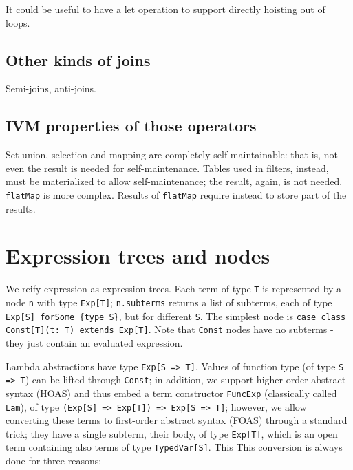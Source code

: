 \documentclass[preprint,authoryear,10pt]{sigplanconf}
\begin{document}
It could be useful to have a let operation to support directly hoisting
out of loops.

\subsection{Other kinds of joins}

Semi-joins, anti-joins.

\subsection{IVM properties of those operators}

Set union, selection and mapping are completely self-maintainable: that
is, not even the result is needed for self-maintenance. Tables used in
filters, instead, must be materialized to allow self-maintenance; the
result, again, is not needed. \texttt{flatMap} is more complex. Results
of \texttt{flatMap} require instead to store part of the results.

\section{Expression trees and nodes}

We reify expression as expression trees. Each term of type \texttt{T} is
represented by a node \texttt{n} with type \texttt{Exp{[}T{]}};
\texttt{n.subterms} returns a list of subterms, each of type
\texttt{Exp{[}S{]} forSome \{type S\}}, but for different \texttt{S}.
The simplest node is
\texttt{case class Const{[}T{]}(t: T) extends Exp{[}T{]}}. Note that
\texttt{Const} nodes have no subterms - they just contain an evaluated
expression.

Lambda abstractions have type \texttt{Exp{[}S =\textgreater{} T{]}}.
Values of function type (of type \texttt{S =\textgreater{} T}) can be
lifted through \texttt{Const}; in addition, we support higher-order
abstract syntax (HOAS) and thus embed a term constructor
\texttt{FuncExp} (classically called \texttt{Lam}), of type
\texttt{(Exp{[}S{]} =\textgreater{} Exp{[}T{]}) =\textgreater{} Exp{[}S =\textgreater{} T{]}};
however, we allow converting these terms to first-order abstract syntax
(FOAS) through a standard trick; they have a single subterm, their body,
of type \texttt{Exp{[}T{]}}, which is an open term containing also terms
of type \texttt{TypedVar{[}S{]}}. This This conversion is always done
for three reasons:
\end{document}
